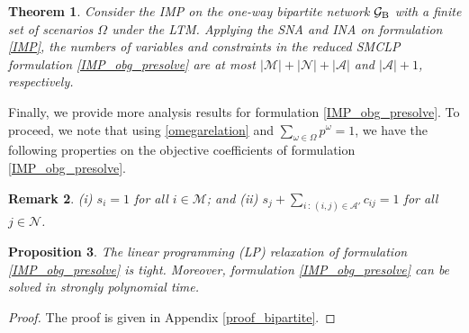 \documentclass[a4paper,10pt]{article}
\theoremstyle{plain}
\newtheorem{theorem}{Theorem}[section]
\newtheorem{remark}[theorem]{Remark}
\newtheorem{proposition}[theorem]{Proposition}
\newcommand{\revv}[1]{{#1}}
\begin{document}
{		%
		
		\begin{theorem}
			\label{bipartitle}
			Consider the IMP on the one-way bipartite \revv{network} $\mathcal{G}_{\rm {B}}$ with a finite set of scenarios $\Omega$ under the LTM.
			Applying the SNA and INA on formulation \eqref{IMP}, the numbers of variables and constraints in the reduced SMCLP formulation \eqref{IMP_obg_presolve} are at most $|\mathcal{M}|+|\mathcal{N}|+|\mathcal{A}|$ and $|\mathcal{A}|+1$, respectively.
		\end{theorem}
		
		
		Finally, we provide more analysis results for formulation \eqref{IMP_obg_presolve}. To proceed, we note that using \eqref{omegarelation} and $\sum_{\omega\in\Omega}p^{\omega}=1$, we have the following properties on the objective coefficients of formulation \eqref{IMP_obg_presolve}.
		\begin{remark}
			\label{defsc}
			(i) $s_i = 1$ for all $i \in \mathcal{M}$; and (ii) $s_j + \sum_{i\,:\,(i,j)\in\mathcal{A}'}c_{ij}=1$ for all $j \in \mathcal{N}$.
		\end{remark}
		
		\begin{proposition}
			\label{theorem:obj}
			The linear programming (LP) relaxation of formulation \eqref{IMP_obg_presolve} is tight.
			Moreover, formulation \eqref{IMP_obg_presolve} can be solved in strongly \revv{polynomial time}.
		\end{proposition}
		\begin{proof}
			The proof \revv{is given in} Appendix \ref{proof_bipartite}.
		\end{proof}
		
}
\end{document}
